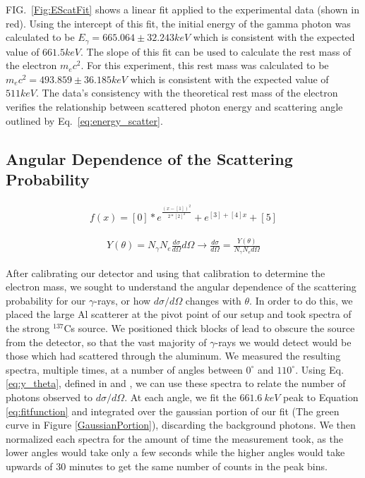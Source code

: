 \documentclass[%
 reprint,
 amsmath,amssymb,
 aps,
 pra,
]{revtex4-1}
\begin{document}
FIG.~\ref{Fig:EScatFit} shows a linear fit applied to the experimental data (shown in red). Using the intercept of this fit, the initial energy of the gamma photon was calculated to be $E_\gamma = 665.064 \pm 32.243 keV$ which is consistent with the expected value of $661.5keV$. The slope of this fit can be used to calculate the rest mass of the electron $m_{e}c^{2}$. For this experiment, this rest mass was calculated to be $m_{e}c^{2} = 493.859 \pm 36.185 keV$ which is consistent with the expected value of $511 keV$. The data's consistency with the theoretical rest mass of the electron verifies the relationship between scattered photon energy and scattering angle outlined by Eq.~\ref{eq:energy_scatter}.

\subsection{Angular Dependence of the Scattering Probability}

\begin{gather}\label{eq:fitfunction}
	f(x) = [0]*e^{\frac{(x-[1])^2}{2*[2]^2}} + e^{[3]+[4]x} + [5]
\end{gather}

\begin{gather}\label{eq:y_theta}
	Y(\theta) = N_\gamma N_e \frac{d\sigma}{d\Omega}d\Omega \rightarrow \frac{d\sigma}{d\Omega} = \frac{Y(\theta)}{N_\gamma N_e d\Omega}
\end{gather}

After calibrating our detector and using that calibration to determine the electron mass, we sought to understand the angular dependence of the scattering probability for our $\gamma$-rays, or how $d \sigma / d \Omega$ changes with $\theta$. In order to do this, we placed the large Al scatterer at the pivot point of our setup and took spectra of the strong $^{137}$Cs source. We positioned thick blocks of lead to obscure the source from the detector, so that the vast majority of $\gamma$-rays we would detect would be those which had scattered through the aluminum. We measured the resulting spectra, multiple times, at a number of angles between $0^{\circ}$ and $110^{\circ}$. Using Eq. \ref{eq:y_theta}, defined in \cite{milissinos} and \cite{manual}, we can use these spectra to relate the number of photons observed to $d\sigma / d\Omega$. At each angle, we fit the $661.6~keV$ peak to Equation \ref{eq:fitfunction} and integrated over the gaussian portion of our fit (The green curve in Figure \ref{GaussianPortion}), discarding the background photons. We then normalized each spectra for the amount of time the measurement took, as the lower angles would take only a few seconds while the higher angles would take upwards of 30 minutes to get the same number of counts in the peak bins.
\end{document}
